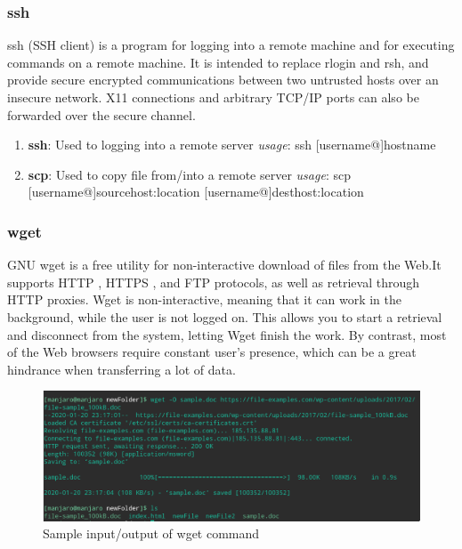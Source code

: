 \documentclass{article}
\begin{document}
\subsubsection{ssh}
ssh (SSH client) is a program for logging into a remote machine and for executing commands on a remote machine. It is intended to replace rlogin and rsh, and provide secure encrypted communications between two untrusted hosts over an insecure network. X11 connections and arbitrary TCP/IP ports can also be forwarded over the secure channel.
\begin{enumerate}
    \item {\bf ssh}: Used to logging into a remote server\newline
    \hspace{\parindent} {\em usage}: ssh [username@]hostname \newline
    
    \item {\bf scp}: Used to copy file from/into a remote server\newline
    \hspace{\parindent} {\em usage}: scp [username@]sourcehost:location [username@]desthost:location\newline
    
\end{enumerate}
\subsubsection{wget}
GNU wget is a free utility for non-interactive download of files from the Web.It supports
HTTP , HTTPS , and FTP protocols, as well as retrieval through HTTP proxies.
Wget is non-interactive, meaning that it can work in the background, while the user
is not logged on. This allows you to start a retrieval and disconnect from the system,
letting Wget finish the work. By contrast, most of the Web browsers require constant
user’s presence, which can be a great hindrance when transferring a lot of data.

\begin{figure}[h!]
    \centering
    \includegraphics[width=.80\textwidth, width=.83\textwidth]{img/p3/ss2.png}
    \caption{Sample input/output of wget command}
\end{figure}
\end{document}
